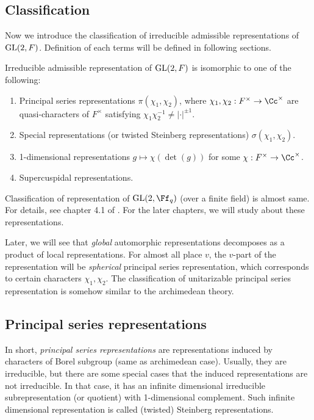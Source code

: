 \subsection{Classification}
Now we introduce the classification of irreducible admissible representations of $\mathrm{GL}(2, F)$. Definition of each terms will be defined in following sections. 
\begin{theorem}
Irreducible admissible representation of $\mathrm{GL}(2, F)$ is isomorphic to one of the following:
\begin{enumerate}
\item Principal series representations $\pi(\chi_{1}, \chi_{2})$, where $\chi_{1}, \chi_{2}:F^{\times} \to \Cc^{\times}$ are quasi-characters of $F^{\times}$ satisfying $\chi_{1}\chi_{2}^{-1} \neq |\cdot |^{\pm 1}$. 
\item Special representations (or twisted Steinberg representations) $\sigma(\chi_{1}, \chi_{2})$. 
\item 1-dimensional representations $g\mapsto \chi(\det(g))$ for some $\chi:F^{\times}\to \Cc^{\times}$. 
\item Supercuspidal representations.
\end{enumerate}
\end{theorem}
Classification of representation of $\GL(2, \Ff_{q})$ (over a finite field) is almost same. For details, see chapter 4.1 of \cite{bu}. For the later chapters, we will study about these representations. 

Later, we will see that \emph{global} automorphic representations decomposes as a product of local representations. For almost all place $v$, the $v$-part of the representation will be \emph{spherical} principal series representation, which corresponds to certain characters $\chi_1, \chi_2$. 
The classification of unitarizable principal series representation is somehow similar to the archimedean theory.


\subsection{Principal series representations}
In short, \emph{principal series representations} are representations induced by characters of Borel subgroup (same as archimedean case). 
Usually, they are irreducible, but there are some special cases that the induced representations are not irreducible. In that case, it has an infinite dimensional irreducible subrepresentation (or quotient) with 1-dimensional complement. Such infinite dimensional representation is called (twisted) Steinberg representations. 

